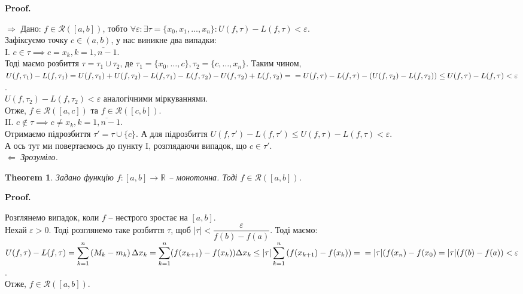 \documentclass[a4paper, 10pt]{article}
\makeatletter
\def\huge{\displaystyle}
\def\qed{$\blacksquare$}
\def\rightproof{$\boxed{\Rightarrow}$ }
\def\leftproof{$\boxed{\Leftarrow}$ }
\theoremstyle{theoremdd}
\newtheorem{theorem}{Theorem}[subsection]
\theoremstyle{theoremdd}
\theoremstyle{theoremdd}
\theoremstyle{theoremdd}
\theoremstyle{theoremdd}
\theoremstyle{theoremdd}
\theoremstyle{theoremdd}
\theoremstyle{theoremdd}
\theoremstyle{theoremdd}
\renewenvironment{proof}[1][Proof.\\]{\par
\pushQED{\hfill \qed}%
\normalfont \topsep6\p@\@plus6\p@\relax
\trivlist
\item\relax
{\bfseries
#1\@addpunct{.}}\hspace\labelsep\ignorespaces
}{%
\popQED\endtrivlist\@endpefalse
}
\makeatother
\begin{document}
\begin{proof}
\rightproof Дано: $f \in \mathcal{R}([a,b])$, тобто $\forall \varepsilon: \exists \tau = \{x_0,x_1,\dots,x_n\}: U(f, \tau) - L(f,\tau) < \varepsilon$.\\
Зафіксуємо точку $c \in (a,b)$, у нас виникне два випадки:\\
I. $c \in \tau \implies c = x_k, k = \overline{1,n-1}$. \\
Тоді маємо розбиття $\tau = \tau_1 \cup \tau_2$, де $\tau_1 = \{x_0,\dots,c\}, \tau_2 = \{c,\dots,x_n\}$. Таким чином,\\
$U(f,\tau_1) - L(f,\tau_1) = U(f,\tau_1) + U(f,\tau_2) - L(f,\tau_1) - L(f,\tau_2) - U(f,\tau_2) + L(f,\tau_2) =  \\ = U(f, \tau) - L(f,\tau) - (U(f,\tau_2) - L(f,\tau_2)) \leq U(f, \tau) - L(f,\tau) < \varepsilon$.\\
$U(f,\tau_2) - L(f,\tau_2) < \varepsilon$ аналогічними міркуваннями.\\
Отже, $f \in \mathcal{R}([a,c])$ та $f \in \mathcal{R}([c,b])$.
\bigskip \\
II. $c \not\in \tau \implies c \neq x_k, k = \overline{1,n-1}$. \\
Отримаємо підрозбиття $\tau' = \tau \cup \{c\}$. А для підрозбиття $U(f,\tau') - L(f,\tau') \leq U(f,\tau) - L(f,\tau) < \varepsilon$.\\
А ось тут ми повертаємось до пункту I, розглядаючи випадок, що $c \in \tau'$.
\bigskip \\
\leftproof \textit{Зрозуміло.}
\end{proof}

\begin{theorem}
Задано функцію $f \colon [a,b] \to \mathbb{R}$ -- монотонна. Тоді $f \in \mathcal{R}([a,b])$.
\end{theorem}

\begin{proof}
Розглянемо випадок, коли $f$ -- нестрого зростає на $[a,b]$.\\
Нехай $\varepsilon > 0$. Тоді розглянемо таке розбиття $\tau$, щоб $|\tau| < \dfrac{\varepsilon}{f(b)-f(a)}$. Тоді маємо:\\
$U(f,\tau) - L(f,\tau) = \huge\sum_{k=1}^n \left( M_k - m_k \right) \Delta x_k = \sum_{k=1}^n (f(x_{k+1})-f(x_k))\Delta x_k \leq |\tau| \huge\sum_{k=1}^{n} \left( f(x_{k+1})-f(x_k) \right) = \\ = |\tau| (f(x_n)-f(x_0) = |\tau| (f(b)-f(a)) < \varepsilon$.\\
Отже, $f \in \mathcal{R}([a,b])$.
\end{proof}
\end{document}
